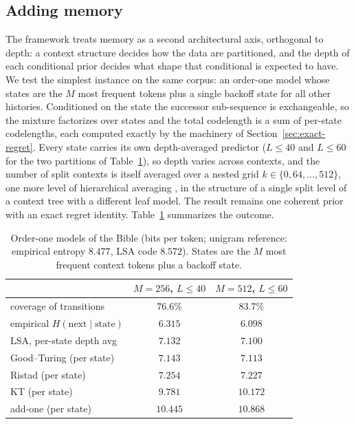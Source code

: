 \documentclass[11pt]{article}
\begin{document}
\subsection{Adding memory}
\label{sec:memory}
The framework treats memory as a second architectural axis, orthogonal to
depth: a context structure decides how the data are partitioned, and the
depth of each conditional prior decides what shape that conditional is
expected to have.  We test the simplest instance on the same corpus: an
order-one model whose states are the \(M\) most frequent tokens plus a
single backoff state for all other histories.  Conditioned on the state
the successor sub-sequence is exchangeable, so the mixture factorizes over
states and the total codelength is a sum of per-state codelengths, each
computed exactly by the machinery of Section~\ref{sec:exact-regret}.
Every state carries its own depth-averaged predictor (\(L\le40\) and
\(L\le60\) for the two partitions of Table~\ref{tab:memory}), so
depth varies across contexts, and the number of split contexts is itself
averaged over a nested grid \(k\in\{0,64,\dots,512\}\), one more level of
hierarchical averaging \cite{FederMerhavHierarchical}, in the structure of
a single split level of a context tree
\cite{willems1995context,willems1998context} with a different leaf model.
The result remains one coherent prior with an exact regret identity. Table~\ref{tab:memory} summarizes the outcome.
\begin{table}[t]
  \centering
  \small
  \begin{tabular}{lcc}
    \toprule
     & \(M=256\), \(L\le40\) & \(M=512\), \(L\le60\)\\
    \midrule
    coverage of transitions            & \(76.6\%\) & \(83.7\%\)\\
    empirical \(H(\text{next}\mid\text{state})\) & \(6.315\) & \(6.098\)\\
    \midrule
    LSA, per-state depth avg & \(\mathbf{7.132}\) & \(\mathbf{7.100}\)\\
    Good--Turing (per state)           & \(7.143\)  & \(7.113\)\\
    Ristad (per state)                 & \(7.254\)  & \(7.227\)\\
    KT (per state)                     & \(9.781\)  & \(10.172\)\\
    add-one (per state)                & \(10.445\) & \(10.868\)\\
    \bottomrule
  \end{tabular}
  \caption{Order-one models of the Bible (bits per token; unigram
  reference: empirical entropy \(8.477\), LSA code
  \(8.572\)).  States are the \(M\) most frequent context tokens plus a
  backoff state.}
  \label{tab:memory}
\end{table}
\end{document}
